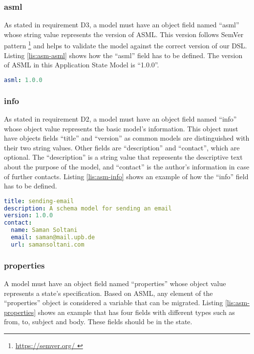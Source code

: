 \subsubsection{asml}
As stated in requirement D3, a model must have an object field named “asml” whose string value represents the version of ASML. This version follows SemVer pattern \footnote{\href{https://semver.org/}{https://semver.org/
}} and helps to validate the model against the correct version of our DSL. Listing \ref{lis:asm-asml} shows how the “asml” field has to be defined. The version of ASML in this Application State Model is “1.0.0”.

\lstset{
  label=lis:asm-asml, caption=Application State Model “asml” field example., 
}
\begin{lstlisting}[language=yaml]
asml: 1.0.0
\end{lstlisting}
\subsubsection{info}
As stated in requirement D2, a model must have an object field named “info” whose object value represents the basic model’s information. This object must have objects fields “title” and “version” as common models are distinguished with their two string values. Other fields are “description” and “contact”, which are optional. The “description” is a string value that represents the descriptive text about the purpose of the model, and “contact” is the author’s information in case of further contacts. Listing \ref{lis:asm-info} shows an example of how the “info” field has to be defined.

\lstset{
  label=lis:asm-info, caption=Application State Model “info” field example. 
}
\begin{lstlisting}[language=yaml]
title: sending-email
description: A schema model for sending an email
version: 1.0.0
contact:
  name: Saman Soltani
  email: saman@mail.upb.de
  url: samansoltani.com

\end{lstlisting}

\subsubsection{properties}
A model must have an object field named “properties” whose object value represents a state’s specification. Based on ASML, any element of the “properties” object is considered a variable that can be migrated.
Listing \ref{lis:asm-properties} shows an example that has four fields with different types such as from, to, subject and body. These fields should be in the state.

